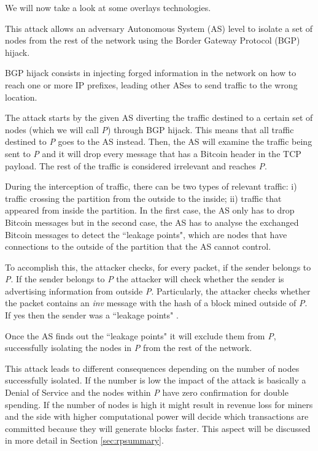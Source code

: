 We will now take a look at some overlays technologies.


\label{sec:partition}
This attack allows an adversary Autonomous System (AS) level to isolate a set of nodes from the rest of the network using the Border Gateway Protocol (BGP) hijack.

BGP hijack consists in injecting forged information in the network on how to reach one or more IP prefixes, leading other ASes to send traffic to the wrong location.

The attack starts by the given AS diverting the traffic destined to a certain set of nodes (which we will call \textit{P}) through BGP hijack. This means that all traffic destined to \textit{P} goes to the AS instead. Then, the AS will examine the traffic being sent to \textit{P} and it will drop every message that has a Bitcoin header in the TCP payload. The rest of the traffic is considered irrelevant and reaches \textit{P}.

During the interception of traffic, there can be two types of relevant traffic: i) traffic crossing the partition from the outside to the inside; ii) traffic that appeared from inside the partition. In the first case, the AS only has to drop Bitcoin messages but in the second case, the AS has to analyse the exchanged Bitcoin messages to detect the ``leakage points", which are nodes that have connections to the outside of the partition that the AS cannot control.

To accomplish this, the attacker checks, for every packet, if the sender belongs to \textit{P}. If the sender belongs to \textit{P} the attacker will check whether the sender is advertising information from outside \textit{P}. Particularly, the attacker checks whether the packet contains an \textit{inv} message with the hash of a block mined outside of \textit{P}. If yes then the sender was a ``leakage points"  \cite{apostolaki2016hijacking}.

Once the AS finds out the ``leakage points" it will exclude them from \textit{P}, successfully isolating the nodes in \textit{P} from the rest of the network.

This attack leads to different consequences depending on the number of nodes successfully isolated. If the number is low the impact of the attack is basically a Denial of Service and the nodes within \textit{P} have zero confirmation for double spending. If the number of nodes is high it might result in revenue loss for miners and the side with higher computational power will decide which transactions are committed because they will generate blocks faster. This aspect will be discussed in more detail in Section \ref{sec:rpsummary}.

